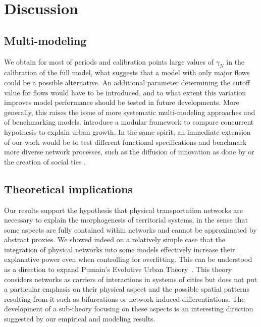 \documentclass[Royal,sageh,times]{sagej}
\begin{document}
\section*{Discussion}


\subsection*{Multi-modeling}

We obtain for most of periods and calibration points large values of $\gamma_N$ in the calibration of the full model, what suggests that a model with only major flows could be a possible alternative. An additional parameter determining the cutoff value for flows would have to be introduced, and to what extent this variation improves model performance should be tested in future developments. More generally, this raises the issue of more systematic multi-modeling approaches and of benchmarking models. \cite{cottineau2015modular} introduce a modular framework to compare concurrent hypothesis to explain urban growth. In the same spirit, an immediate extension of our work would be to test different functional specifications and benchmark more diverse network processes, such as the diffusion of innovation as done by \cite{favaro2011gibrat} or the creation of social ties \citep{frasco2014spatially}.

\subsection*{Theoretical implications}


Our results support the hypothesis that physical transportation networks are necessary to explain the morphogenesis of territorial systems, in the sense that some aspects are fully contained within networks and cannot be approximated by abstract proxies. We showed indeed on a relatively simple case that the integration of physical networks into some models effectively increase their explanative power even when controlling for overfitting. This can be understood as a direction to expand Pumain's Evolutive Urban Theory~\citep{pumain1997pour}. This theory considers networks as carriers of interactions in systems of cities but does not put a particular emphasis on their physical aspect and the possible spatial patterns resulting from it such as bifurcations or network induced differentiations. The development of a sub-theory focusing on these aspects is an interesting direction suggested by our empirical and modeling results.
\end{document}
